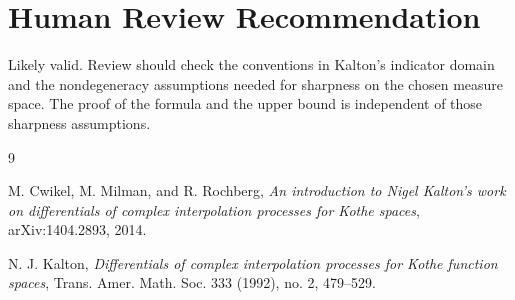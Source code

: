 \documentclass[11pt]{article}
\newcommand{\1}{\mathbf 1}
\begin{document}
\section*{Human Review Recommendation}

Likely valid. Review should check the conventions in Kalton's indicator
domain and the nondegeneracy assumptions needed for sharpness on the chosen
measure space. The proof of the formula and the upper bound is independent of
those sharpness assumptions.

\begin{thebibliography}{9}

M. Cwikel, M. Milman, and R. Rochberg,
\emph{An introduction to Nigel Kalton's work on differentials of complex
interpolation processes for Kothe spaces},
arXiv:1404.2893, 2014.

N. J. Kalton,
\emph{Differentials of complex interpolation processes for Kothe function
spaces},
Trans. Amer. Math. Soc. 333 (1992), no. 2, 479--529.

\end{thebibliography}
\end{document}
